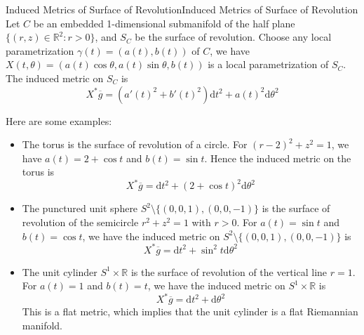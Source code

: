\documentclass[../main.tex]{subfiles}
\begin{document}
\begin{example}{Induced Metrics of Surface of Revolution}{Induced Metrics of Surface of Revolution}
  Let $C$ be an embedded 1-dimensional submanifold of the half plane $\{(r,z)\in \mathbb{R}^2: r> 0\}$, and $S_C$ be the surface of revolution. Choose any local parametrization $\gamma(t) = (a(t), b(t))$ of $C$, we have $X(t, \theta) = (a(t)\cos \theta, a(t)\sin \theta, b(t))$ is a local parametrization of $S_C$. The induced metric on $S_C$ is
  \begin{equation*}
    X^*\overline{g} = (a'(t)^2 + b'(t)^2)\mathrm{d} t^2 + a(t)^2 \mathrm{d} \theta^2
  \end{equation*}

  Here are some examples:
  \begin{itemize}
    \item The torus is the surface of revolution of a circle. For $(r-2)^2 + z^2 = 1$, we have $a(t) = 2 + \cos t$ and $b(t) = \sin t$. Hence the induced metric on the torus is
      \begin{equation*}
        X^*\overline{g} = \mathrm{d} t^2 + (2 + \cos t)^2 \mathrm{d} \theta^2
      \end{equation*}
    \item The punctured unit sphere $S^2\setminus \{(0,0,1), (0,0,-1)\}$ is the surface of revolution of the semicircle $r^2 + z^2 = 1$ with $r>0$. For $a(t) = \sin t$ and $b(t) = \cos t$, we have the induced metric on $S^2\setminus \{(0,0,1), (0,0,-1)\}$ is
      \begin{equation*}
        X^*\overline{g} = \mathrm{d} t^2 + \sin^2 t \mathrm{d} \theta^2
      \end{equation*}
    \item The unit cylinder $S^1 \times \mathbb{R}$ is the surface of revolution of the vertical line $r=1$. For $a(t) = 1$ and $b(t) = t$, we have the induced metric on $S^1 \times \mathbb{R}$ is
      \begin{equation*}
        X^*\overline{g} = \mathrm{d} t^2 + \mathrm{d} \theta^2
      \end{equation*}
      This is a flat metric, which implies that the unit cylinder is a flat Riemannian manifold.
  \end{itemize}
\end{example}
\end{document}
